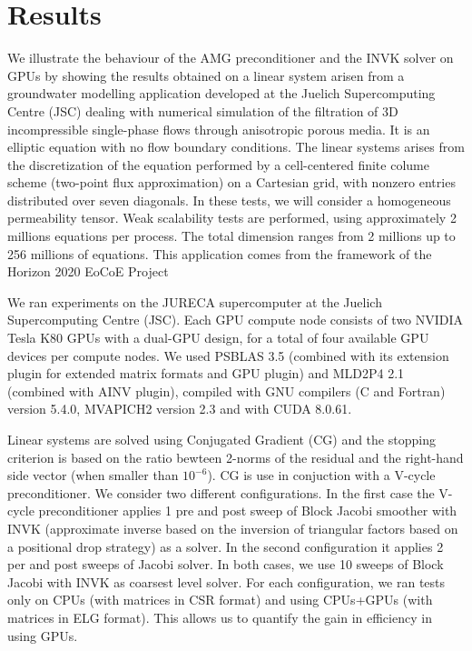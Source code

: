 \section{Results}

We illustrate the behaviour of the AMG preconditioner and the INVK
solver on GPUs  by showing the results obtained on a linear system
arisen from a groundwater modelling application developed at the
Juelich Supercomputing Centre (JSC)  dealing with numerical simulation
of the filtration of 3D incompressible single-phase flows through
anisotropic porous media. It is an elliptic equation with no flow
boundary conditions. The linear systems arises from the discretization
of the equation performed by a cell-centered finite colume scheme
(two-point flux approximation) on a Cartesian grid, with nonzero
entries distributed over seven diagonals. In these tests, we will
consider a homogeneous permeability tensor.  
Weak scalability tests are performed, using approximately 2 millions
equations per process. The total dimension ranges from 2 millions up
to 256 millions of equations. 
This application comes from the framework of the Horizon 2020 EoCoE
Project 

We ran experiments on the JURECA supercomputer at the Juelich
Supercomputing Centre (JSC).  Each GPU compute node consists of two
NVIDIA Tesla K80 GPUs with a dual-GPU design, for a total of four
available GPU devices per compute nodes.  
We used PSBLAS 3.5 (combined with its extension plugin for extended
matrix formats and GPU plugin) and MLD2P4 2.1 (combined with AINV
plugin),  compiled with  GNU compilers (C and Fortran) version 5.4.0,
MVAPICH2 version 2.3 and with CUDA 8.0.61. 

Linear systems are solved using Conjugated Gradient (CG) and the
stopping criterion is based on the ratio bewteen 2-norms of the
residual and the right-hand side vector (when smaller than
$10^{-6}$). CG is use in conjuction with a V-cycle preconditioner. We
consider two different configurations. In the first case the V-cycle
preconditioner applies 1 pre and post sweep of Block Jacobi smoother
with INVK (approximate inverse based on the inversion of triangular
factors based on a positional drop strategy) as a solver. In the
second configuration it applies 2 per and post sweeps of Jacobi
solver. In both cases, we use 10 sweeps of Block Jacobi with INVK  as
coarsest level solver.   
For each configuration, we ran tests only on CPUs (with matrices in
CSR format) and using CPUs+GPUs (with matrices in ELG format). This
allows us to quantify the gain in efficiency in using GPUs.   


